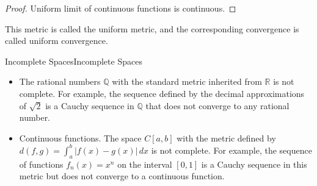 \documentclass[../main.tex]{subfiles}
\begin{document}
\begin{proof}
Uniform limit of continuous functions is continuous.
\end{proof}
\begin{remark}
	This metric is called the uniform metric, and the corresponding convergence is called uniform convergence.
\end{remark}

\begin{example}{Incomplete Spaces}{Incomplete Spaces}
	\begin{itemize}
		\item The rational numbers $\mathbb{Q}$ with the standard metric inherited from $\mathbb{R}$ is not complete. For example, the sequence defined by the decimal approximations of $\sqrt{2}$ is a Cauchy sequence in $\mathbb{Q}$ that does not converge to any rational number.
		\item Continuous functions. The space $C[a,b]$ with the metric defined by $\displaystyle d(f, g) = \int_a^b |f(x) - g(x)| \, dx$ is not complete. For example, the sequence of functions $f_n(x) = x^n$ on the interval $[0, 1]$ is a Cauchy sequence in this metric but does not converge to a continuous function.
	\end{itemize}
\end{example}
\end{document}
